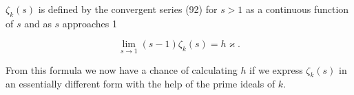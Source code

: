$\zeta_k(s)$ is defined by the convergent series (92) for $s > 1$ as a continuous function of $s$ and as $s$ approaches 1

$$\lim_{s \to 1} (s - 1)\zeta_k(s) = h\varkappa.$$

From this formula we now have a chance of calculating $h$ if we express $\zeta_k(s)$ in an essentially different form with the help of the prime ideals of $k$.
